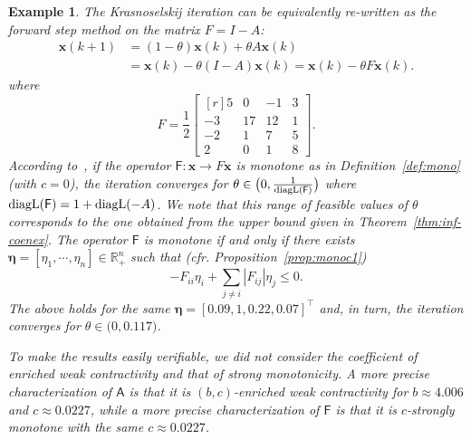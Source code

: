 \documentclass[journal,twoside,web]{ieeecolor}
\makeatletter
\newcommand{\abs}[1]{{\left\vert #1 \right\vert}}
\newcommand{\norm}[1]{{\left\vert\kern-0.25ex\left\vert #1\right\vert\kern-0.25ex\right\vert}}
\newcommand{\rea }{\mathbb{R}}
\newcommand{\xb}{\boldsymbol{x}}
\newcommand{\etab}{\boldsymbol{\eta}}
\newcommand{\Fs}{\mathsf{F}}
\newcommand{\As}{\mathsf{A}}
\newcommand{\diego}[1]{\color{red}{ @Diego: #1} \color{black}}
\newtheorem{exmp}{Example}
\makeatother
\begin{document}
\begin{exmp}
The Krasnoselskij iteration can be equivalently re-written as the forward step method on the matrix $F=I-A$:
%
$$
\begin{aligned}
    \xb(k+1) &= (1-\theta)\xb(k) + \theta A\xb(k)\\
    & = \xb(k) - \theta(I- A)\xb(k) = \xb(k) - \theta F\xb(k).
\end{aligned}
$$
where
%
$$
F= \frac{1}{2}\begin{bmatrix*}[r]
    5&     0&   -1&    3\\
   -3&    17&    12&    1\\
   -2&     1&    7&    5\\
    2&     0&    1&    8
\end{bmatrix*}.
$$
%
According to~\cite[Theorem 26(iii)]{davydov2024non}, if the operator ${\Fs:\xb\rightarrow F\xb}$ is monotone as in Definition~\ref{def:mono} (with $c=0$), the iteration converges for $\theta\in\big(0,\frac{1}{\textnormal{diagL}(\Fs)}\big)$ where $\textnormal{diagL}(\Fs)=1+\textnormal{diagL}(-A)$.
%
We note that this range of feasible values of $\theta$ corresponds to the one obtained from the upper bound given in Theorem~\ref{thm:inf-coenex}.
%
The operator $\Fs$ is monotone if and only if there exists ${\etab=[\eta_1,\cdots,\eta_n]\in\rea^n_{+}}$ such that (cfr. Proposition~\ref{prop:monoc1})
%
$$
-F_{ii}\eta_i +\sum_{j\neq i} \abs{F_{ij}}\eta_j \leq 0.
$$ 
%
The above holds for the same ${\etab=[0.09,1,0.22,0.07]^\top}$ and, in turn, the iteration converges for $\theta\in\big(0,0.117\big)$.

To make the results easily verifiable, we did not consider the coefficient of enriched weak contractivity and that of strong monotonicity. A more precise characterization of $\As$ is that it is $(b,c)$-enriched weak contractivity for $b\approx 4.006$ and ${c\approx 0.0227}$, while a more precise characterization of $\Fs$ is that it is $c$-strongly monotone with the same $c\approx 0.0227$.

\end{exmp}
\end{document}
